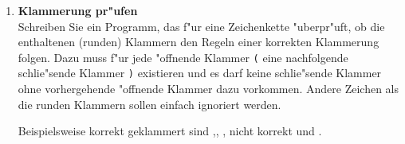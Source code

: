 \begin{enumerate}[1.]
\item \textbf{Klammerung pr"ufen}\\
Schreiben Sie ein Programm, das f"ur eine Zeichenkette "uberpr"uft, ob
die enthaltenen (runden) Klammern den Regeln einer korrekten
Klammerung folgen. Dazu muss f"ur jede "offnende Klammer
\glqq\texttt{(}\grqq{} eine nachfolgende schlie"sende Klammer
\glqq\texttt{)}\grqq{} existieren und es darf keine schlie"sende
Klammer ohne vorhergehende "offnende Klammer dazu vorkommen. Andere
Zeichen als die runden Klammern sollen einfach ignoriert werden.

Beispielsweise korrekt geklammert sind ,, , nicht korrekt  und .


\end{enumerate}
